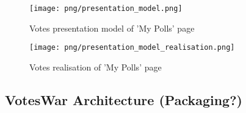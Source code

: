  
\begin{figure}
\centering
\texttt{[image: png/presentation\_model.png]}
\caption{Votes presentation model of 'My Polls' page}
\label{F:presentation_model}
\end{figure}

\begin{figure}
\centering
\texttt{[image: png/presentation\_model\_realisation.png]}
\caption{Votes realisation of 'My Polls' page}
\label{F:presentation_model_realisation}
\end{figure}

\subsection{VotesWar Architecture (Packaging?)}
